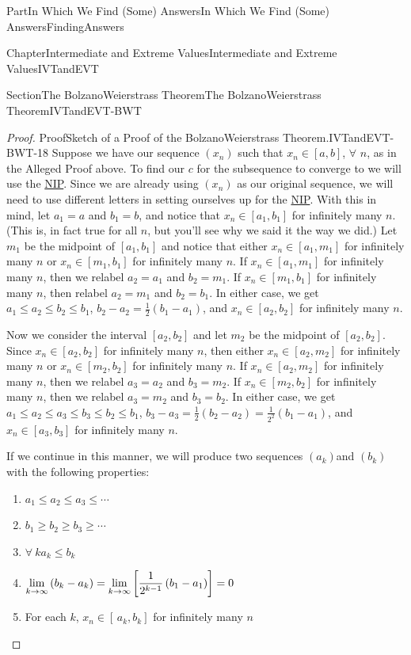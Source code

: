 \documentclass[oneside,10pt,]{book}
\numberwithin{equation}{part}
\def\limit#1#2#3{{\displaystyle\lim_{#1\rightarrow #2}#3}}
\begin{document}
\begin{partptx}{Part}{In Which We Find (Some) Answers}{}{In Which We Find (Some) Answers}{}{}{FindingAnswers}
\begin{chapterptx}{Chapter}{Intermediate and Extreme Values}{}{Intermediate and Extreme Values}{}{}{IVTandEVT}
\begin{sectionptx}{Section}{The Bolzano\textendash{}Weierstrass Theorem}{}{The Bolzano\textendash{}Weierstrass Theorem}{}{}{IVTandEVT-BWT}
\begin{proof}{Proof}{Sketch of a Proof of the Bolzano\textendash{}Weierstrass Theorem.}{IVTandEVT-BWT-18}
Suppose we have our sequence \(\left(x_n\right)\) such that \(x_n\in[a,b]\), \(\forall\) \(n\), as in the Alleged Proof above.  To find our \(c\) for the subsequence to converge to we will use the \hyperref[NIP]{NIP}. Since we are already using \(\left(x_n\right)\) as our original sequence, we will need to use different letters in setting ourselves up for the \hyperref[NIP]{NIP}. With this in mind, let \(a_1=a\) and \(b_1=b\), and notice that \(x_n\in[a_1,b_1]\) for infinitely many \(n\).  (This is, in fact true for all \(n\), but you'll see why we said it the way we did.)  Let \(m_1\) be the midpoint of \([a_1,b_1]\) and notice that either \(x_n\in[a_1,m_1]\) for infinitely many \(n\) or \(x_n\in[m_1,b_1]\) for infinitely many \(n\).  If \(x_n\in[a_1,m_1]\) for infinitely many \(n\), then we relabel \(a_2=a_1\) and \(b_2=m_1\).  If \(x_n\in[m_1,b_1]\) for infinitely many \(n\), then relabel \(a_2=m_1\) and \(b_2=b_1\).  In either case, we get \(a_1\leq a_2\leq b_2\leq b_1\), \(b_2-a_2=\frac{1}{2}\left(b_1-a_1\right)\), and \(x_n\in[a_2,b_2]\) for infinitely many \(n\).%
\par
Now we consider the interval \([a_2,b_2]\) and let \(m_2\) be the midpoint of \([a_2,b_2]\). Since \(x_n\in[a_2,b_2]\) for infinitely many \(n\), then either \(x_n\in[a_2,m_2]\) for infinitely many \(n\) or \(x_n\in[m_2,b_2]\) for infinitely many \(n\). If \(x_n\in[a_2,m_2]\) for infinitely many \(n\), then we relabel \(a_3=a_2\) and \(b_3=m_2\). If \(x_n\in[m_2,b_2]\) for infinitely many \(n\), then we relabel \(a_3=m_2\) and \(b_3=b_2\). In either case, we get \(a_1\leq a_2\leq a_3\leq b_3\leq b_2\leq b_1\), \(b_3-a_3=\frac{1}{2}\left(b_2-a_2\right)=\frac{1}{2^2}\left(b_1-a_1\right)\), and \(x_n\in[a_3,b_3]\) for infinitely many \(n\).%
\par
If we continue in this manner, we will produce two sequences \(\left(a_k\right)\)and \(\left(b_k\right)\) with the following properties:%
\begin{enumerate}
\item{}\(\displaystyle a_1\leq a_2\leq a_3\leq\cdots\)%
\item{}\(\displaystyle b_1\geq b_2\geq b_3\geq\cdots\)%
\item{}\(\forall\ k\)\(a_k\leq b_k\)%
\item{}\(\displaystyle \displaystyle\limit{k}{\infty}{\left(b_k-a_k\right)}=\limit{k}{\infty}{\left[
\frac{1}{2^{k-1}}\left(b_1-a_1\right)\right]}=0\)%
\item{}For each \(k\), \(x_n\in[\,a_k,b_k]\) for infinitely many \(n\)%
\end{enumerate}

\end{proof}
\end{sectionptx}
\end{chapterptx}
\end{partptx}
\end{document}
